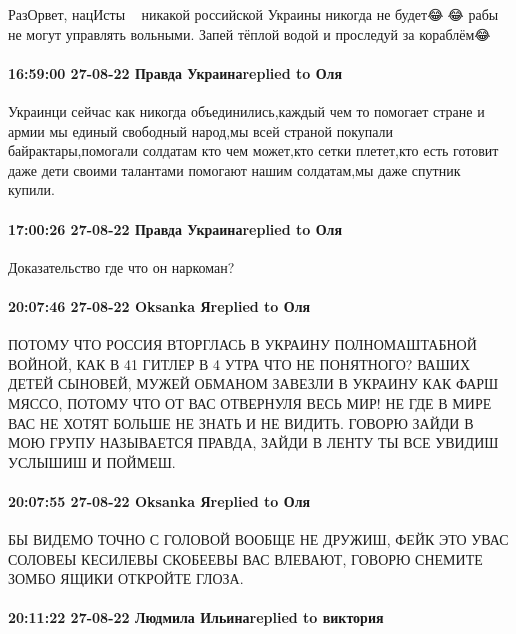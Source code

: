 РазОрвет, нацИсты🤣😂🤣 никакой российской Украины никогда не будет😂🤣😂 рабы
не могут управлять вольными. Запей тёплой водой и проследуй за кораблём😂

\paragraph{16:59:00 27-08-22 Правда Украинаreplied to Оля}

Украинци сейчас как никогда объединились,каждый чем то помогает стране и армии
мы единый свободный народ,мы всей страной покупали байрактары,помогали солдатам
кто чем может,кто сетки плетет,кто есть готовит даже дети своими талантами
помогают нашим солдатам,мы даже спутник купили.

\paragraph{17:00:26 27-08-22 Правда Украинаreplied to Оля}

Доказательство где что он наркоман?

\paragraph{20:07:46 27-08-22 Oksanka Яreplied to Оля}

ПОТОМУ ЧТО РОССИЯ ВТОРГЛАСЬ В УКРАИНУ ПОЛНОМАШТАБНОЙ ВОЙНОЙ, КАК В 41 ГИТЛЕР В
4 УТРА ЧТО НЕ ПОНЯТНОГО? ВАШИХ ДЕТЕЙ СЫНОВЕЙ, МУЖЕЙ ОБМАНОМ ЗАВЕЗЛИ В УКРАИНУ
КАК ФАРШ МЯССО, ПОТОМУ ЧТО ОТ ВАС ОТВЕРНУЛЯ ВЕСЬ МИР! НЕ ГДЕ В МИРЕ ВАС НЕ
ХОТЯТ БОЛЬШЕ НЕ ЗНАТЬ И НЕ ВИДИТЬ. ГОВОРЮ ЗАЙДИ В МОЮ ГРУПУ НАЗЫВАЕТСЯ ПРАВДА,
ЗАЙДИ В ЛЕНТУ ТЫ ВСЕ УВИДИШ УСЛЫШИШ И ПОЙМЕШ.



\paragraph{20:07:55 27-08-22 Oksanka Яreplied to Оля}

БЫ ВИДЕМО ТОЧНО С ГОЛОВОЙ ВООБЩЕ НЕ ДРУЖИШ, ФЕЙК ЭТО УВАС СОЛОВЕЫ КЕСИЛЕВЫ
СКОБЕЕВЫ ВАС ВЛЕВАЮТ, ГОВОРЮ СНЕМИТЕ ЗОМБО ЯЩИКИ ОТКРОЙТЕ ГЛОЗА.

\paragraph{20:11:22 27-08-22 Людмила Ильинаreplied to виктория}

